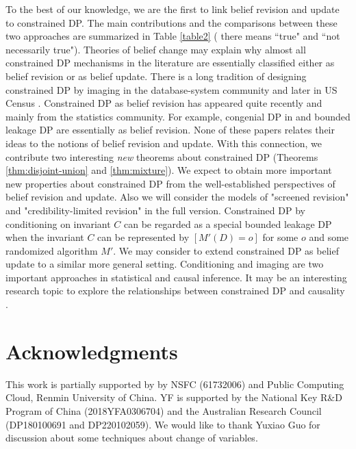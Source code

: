 \documentclass[11pt]{article}
\begin{document}
To the best of our knowledge, we are the first to link belief revision and update to constrained DP.  The main contributions  and the comparisons between these two approaches are summarized in Table \ref{table2} ( there means ``true" and  ``not necessarily true").  Theories of belief change may explain  why almost all constrained DP mechanisms in the literature are essentially classified either as belief revision or as belief update.  There is a long tradition of designing constrained DP by imaging in the database-system community \cite{Zhang2016privtree,Hay2010boosting,Wang2020locally,Lee2015maximum,Zhu2021bias,Gao2022subspace} and later in US Census \cite{Abowd20222020}.   Constrained DP as belief revision has appeared quite recently and mainly from the statistics community.
 For example, congenial DP in \cite{GongM20,Gong2022Transparent} and bounded leakage DP \cite{LigettPR20} are essentially as belief revision. None of these papers relates their ideas to the notions of belief revision and update. With this connection, we contribute two interesting \emph{new} theorems about constrained DP (Theorems \ref{thm:disjoint-union} and \ref{thm:mixture}). We expect to obtain more important new properties about constrained DP from the well-established perspectives of belief revision and update. Also we will consider the models of  "screened revision" and "credibility-limited revision" in the full version.
Constrained DP by conditioning on invariant $C$ can be regarded as a special bounded leakage DP when the invariant $C$ can be represented by $[M'(D) =o]$ for some $o$ and some randomized algorithm $M'$. We may consider to extend constrained DP as belief update to a similar more general setting. 
 Conditioning and imaging are two important approaches in statistical and causal inference. It may be an interesting research topic to explore the relationships between constrained DP and causality \cite{Tschantz2020sok}. 

\section*{Acknowledgments}
This work is partially supported by  by NSFC (61732006) and Public Computing Cloud, Renmin University of China. YF is supported by the National Key R\&D Program of China (2018YFA0306704) and the Australian Research Council (DP180100691 and DP220102059). We would like to thank Yuxiao Guo for discussion about some techniques about change of variables. 



\end{document}
